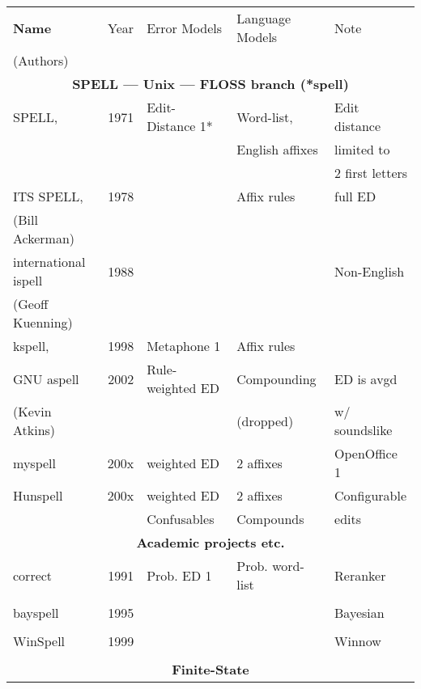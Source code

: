 \documentclass[officiallayout]{unihelcompling}
\begin{document}
\begin{table}
    \centering
    \begin{tiny}
    \begin{tabular}{|l|r|l|l|l|}
        \hline
        \bf Name & Year & Error Models & Language Models & Note \\
(Authors) & & & & \\
        \hline
        \multicolumn{5}{|c|}{\bf SPELL --- Unix --- FLOSS branch (*spell) }\\
        \hline
             SPELL, & 1971 & Edit-Distance 1* & Word-list, & Edit distance \\
\citep{gorin1971spell} &  & & English affixes & limited to \\
                                  &  & &              & 2 first letters \\
        ITS SPELL, & 1978 &  & Affix rules & full ED \\
     (Bill Ackerman) & & & & \\
        international ispell & 1988 & & & Non-English \\
              (Geoff Kuenning) & & & & \\
        \hline
        kspell, & 1998 & Metaphone 1 & Affix rules & \\
        GNU aspell & 2002 & Rule-weighted ED & Compounding & ED is avgd \\
    (Kevin Atkins) & & & (dropped) & w/ soundslike \\
        \hline
        myspell & 200x & weighted ED & 2 affixes & OpenOffice 1 \\
        \hline
        Hunspell & 200x & weighted ED & 2 affixes & Configurable \\
                 &      & Confusables & Compounds & edits \\
        \hline
        \multicolumn{5}{|c|}{\bf Academic projects etc.} \\
        \hline
        correct & 1991 & Prob. ED 1 & Prob. word-list & Reranker \\
        \citep{church1991probability} & & & & \\
        \hline
        bayspell  & 1995 & & & Bayesian \\
        \citep{golding1995bayesian} \\
        \hline
        WinSpell & 1999 & & & Winnow \\
        \citep{golding1999winnow} & \\
        \hline
        \multicolumn{5}{|c|}{\bf Finite-State} \\

\end{tabular}
\end{tiny}
\end{table}
\end{document}
